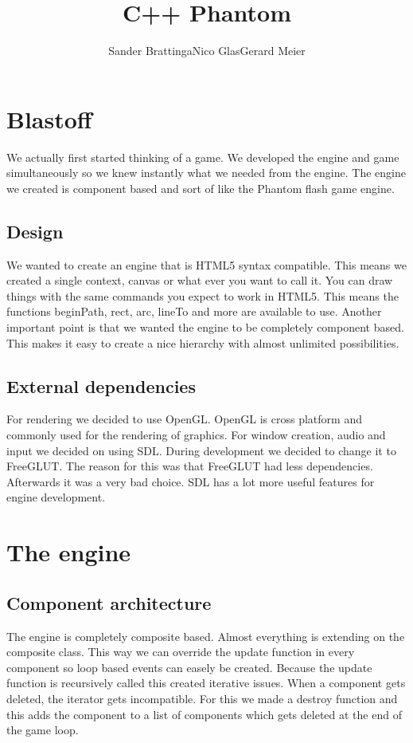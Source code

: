 \documentclass[acmtocl,acmnow]{acmtrans2m}
\title{C++ Phantom}
\author{Sander Brattinga\newline Nico Glas\newline Gerard Meier}
\begin{document}
\begin{bottomstuff}
\end{bottomstuff}

\maketitle
\section{Blastoff}
We actually first started thinking of a game. We developed the engine and game simultaneously so we knew instantly what we needed from the engine. The engine we created is component based and sort of like the Phantom flash game engine. 

\subsection{Design}
We wanted to create an engine that is HTML5 syntax compatible. This means we created a single context, canvas or what ever you want to call it. You can draw things with the same commands you expect to work in HTML5. This means the functions beginPath, rect, arc, lineTo and more are available to use.\newline
Another important point is that we wanted the engine to be completely component based. This makes it easy to create a nice hierarchy with almost unlimited possibilities.

\subsection{External dependencies}
For rendering we decided to use OpenGL. OpenGL is cross platform and commonly used for the rendering of graphics. For window creation, audio and input we decided on using SDL. During development we decided to change it to FreeGLUT. The reason for this was that FreeGLUT had less dependencies. Afterwards it was a very bad choice. SDL has a lot more useful features for engine development.

\section{The engine}
\subsection{Component architecture}
The engine is completely composite based. Almost everything is extending on the composite class. This way we can override the update function in every component so loop based events can easely be created. Because the update function is recursively called this created iterative issues. When a component gets deleted, the iterator gets incompatible. For this we made a destroy function and this adds the component to a list of components which gets deleted at the end of the game loop. 
\end{document}
